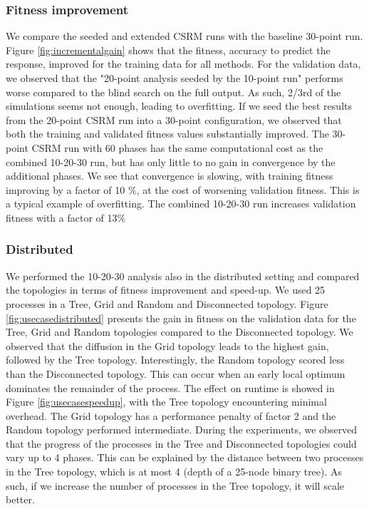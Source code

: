 \subsubsection{Fitness improvement}
We compare the seeded and extended CSRM runs with the baseline 30-point run.  Figure \ref{fig:incrementalgain} shows that the fitness, accuracy to predict the response, improved for the training data for all methods. For the validation data, we observed that the "20-point analysis seeded by the 10-point run" performs worse compared to the blind search on the full output. As such, 2/3rd of the simulations seems not enough, leading to overfitting. If we seed the best results from the 20-point CSRM run into a 30-point configuration, we observed that both the training and validated fitness values substantially improved. The 30-point CSRM run with 60 phases has the same computational cost as the combined 10-20-30 run, but has only little to no gain in convergence by the additional phases. We see that convergence is slowing, with training fitness improving by a factor of 10 \%, at the cost of worsening validation fitness. %
This is a typical example of overfitting. The combined 10-20-30 run increases validation fitness with a factor of 13\%

\subsubsection{Distributed}
We performed the 10-20-30 analysis also in the distributed setting and compared the topologies in terms of fitness improvement and speed-up. We used 25 processes in a Tree, Grid and Random and   Disconnected topology. Figure \ref{fig:usecasedistributed} presents the gain in fitness on the validation data for the Tree, Grid and Random topologies compared to the Disconnected topology. We observed that the diffusion in the Grid topology leads to the highest gain, followed by the Tree topology. Interestingly, the Random topology scored less than the Disconnected topology. This can occur when an early local optimum dominates the remainder of the process. The effect on runtime is showed in Figure \ref{fig:usecasespeedup}, with the Tree topology encountering minimal overhead. The Grid topology has a performance penalty of factor 2 and the Random topology performed intermediate. During the experiments, we observed that the progress of the processes in the Tree and Disconnected topologies could vary up to 4 phases. This can be explained by the distance between two processes in the Tree topology, which is at most 4 (depth of a 25-node binary tree). As such, if we increase the number of processes in the Tree topology, it will scale better. %

